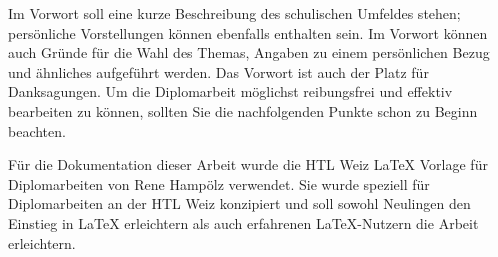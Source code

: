 \clearpage

\unnumberedSection{\prologuename}

Im Vorwort soll eine kurze Beschreibung des schulischen Umfeldes stehen; persönliche
Vorstellungen können ebenfalls enthalten sein. Im Vorwort können auch Gründe für die
Wahl des Themas, Angaben zu einem persönlichen Bezug und ähnliches aufgeführt werden.
Das Vorwort ist auch der Platz für Danksagungen. Um die Diplomarbeit möglichst
reibungsfrei und effektiv bearbeiten zu können, sollten Sie die nachfolgenden
Punkte schon zu Beginn beachten.

\begin{note}
    Für die Dokumentation dieser Arbeit wurde die HTL Weiz LaTeX Vorlage für
    Diplomarbeiten von Rene Hampölz verwendet. Sie wurde speziell für Diplomarbeiten
    an der HTL Weiz konzipiert und soll sowohl Neulingen den Einstieg in LaTeX
    erleichtern als auch erfahrenen LaTeX-Nutzern die Arbeit erleichtern.
    \cite{template:latex}
\end{note}

\printChangelog

\clearpage